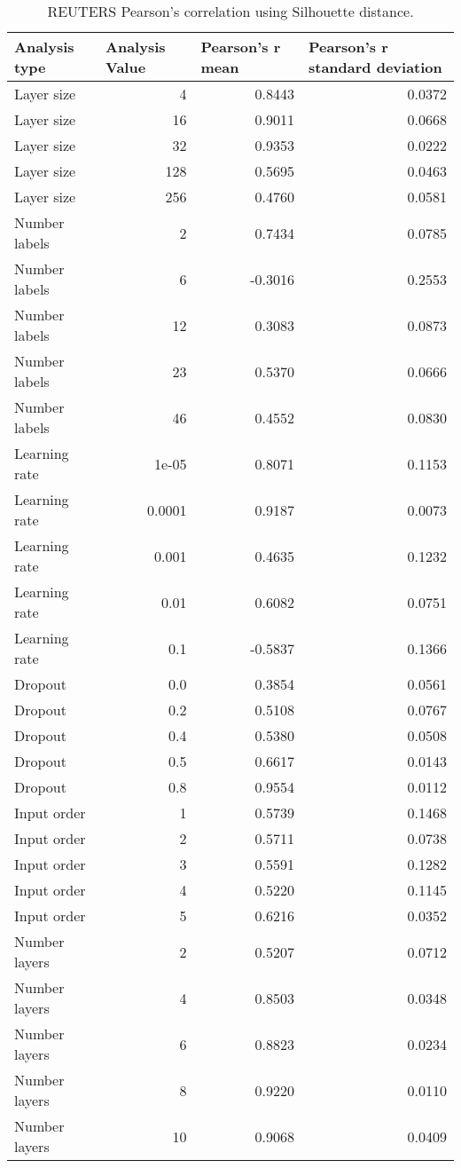 \documentclass{article}
\begin{document}
\begin{table}[H]
\centering
\begin{tabular}{@{}lrrr@{}}
\toprule
Analysis type & \multicolumn{1}{l}{Analysis Value} & \multicolumn{1}{l}{Pearson's r mean} & \multicolumn{1}{l}{Pearson's r standard deviation} \\ \midrule
Layer size & 4 & 0.8443 & 0.0372 \\ 
Layer size & 16 & 0.9011 & 0.0668 \\ 
Layer size & 32 & 0.9353 & 0.0222 \\ 
Layer size & 128 & 0.5695 & 0.0463 \\ 
Layer size & 256 & 0.4760 & 0.0581 \\ 
Number labels & 2 & 0.7434 & 0.0785 \\ 
Number labels & 6 & -0.3016 & 0.2553 \\ 
Number labels & 12 & 0.3083 & 0.0873 \\ 
Number labels & 23 & 0.5370 & 0.0666 \\ 
Number labels & 46 & 0.4552 & 0.0830 \\ 
Learning rate & 1e-05 & 0.8071 & 0.1153 \\ 
Learning rate & 0.0001 & 0.9187 & 0.0073 \\ 
Learning rate & 0.001 & 0.4635 & 0.1232 \\ 
Learning rate & 0.01 & 0.6082 & 0.0751 \\ 
Learning rate & 0.1 & -0.5837 & 0.1366 \\ 
Dropout & 0.0 & 0.3854 & 0.0561 \\ 
Dropout & 0.2 & 0.5108 & 0.0767 \\ 
Dropout & 0.4 & 0.5380 & 0.0508 \\ 
Dropout & 0.5 & 0.6617 & 0.0143 \\ 
Dropout & 0.8 & 0.9554 & 0.0112 \\ 
Input order & 1 & 0.5739 & 0.1468 \\ 
Input order & 2 & 0.5711 & 0.0738 \\ 
Input order & 3 & 0.5591 & 0.1282 \\ 
Input order & 4 & 0.5220 & 0.1145 \\ 
Input order & 5 & 0.6216 & 0.0352 \\ 
Number layers & 2 & 0.5207 & 0.0712 \\ 
Number layers & 4 & 0.8503 & 0.0348 \\ 
Number layers & 6 & 0.8823 & 0.0234 \\ 
Number layers & 8 & 0.9220 & 0.0110 \\ 
Number layers & 10 & 0.9068 & 0.0409 \\ 
\bottomrule
\end{tabular}
\caption{REUTERS Pearson's correlation using Silhouette distance.}
\end{table}
\end{document}
